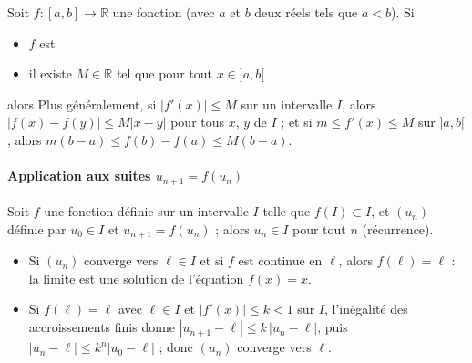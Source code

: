                   \begin{thm}
                        Soit $f:[a,b]\rightarrow\mathbb{R}$ une fonction (avec $a$ et $b$ deux r\'eels tels que $a<b$).
                        Si 
                        \begin{itemize}
                              \item $f$ est \hypothesebox{continue sur $[a,b]$ et d\'erivable sur $]a,b[$}
                              \item il existe $M\in\mathbb{R}$ tel que  pour tout $x\in]a,b[$
                        \end{itemize}
                        alors 
                        Plus g\'en\'eralement, si $|f'(x)| \leq M$ sur un intervalle $I$, alors $|f(x) - f(y)| \leq M |x - y|$ pour tous $x$, $y$ de $I$ ;
                        et si $m \leq f'(x) \leq M$ sur $]a,b[$, alors $m(b-a) \leq f(b) - f(a) \leq M(b-a)$.
                  \end{thm}
                  \paragraph{Application aux suites $u_{n+1} = f(u_n)$}
                        Soit $f$ une fonction d\'efinie sur un intervalle $I$ telle que $f(I) \subset I$, et $(u_n)$ d\'efinie par $u_0 \in I$ et
                        $u_{n+1} = f(u_n)$ ; alors $u_n \in I$ pour tout $n$ (r\'ecurrence).
                        \begin{itemize}
                              \item Si $(u_n)$ converge vers $\ell \in I$ et si $f$ est continue en $\ell$, alors $f(\ell) = \ell$ :
                                    la limite est une solution de l'\'equation $f(x) = x$.
                              \item Si $f(\ell) = \ell$ avec $\ell \in I$ et $|f'(x)| \leq k < 1$ sur $I$, l'in\'egalit\'e des accroissements finis donne
                                    $|u_{n+1} - \ell| \leq k\,|u_n - \ell|$, puis $|u_n - \ell| \leq k^n |u_0 - \ell|$ ; donc $(u_n)$ converge vers $\ell$.
                        \end{itemize}
            
